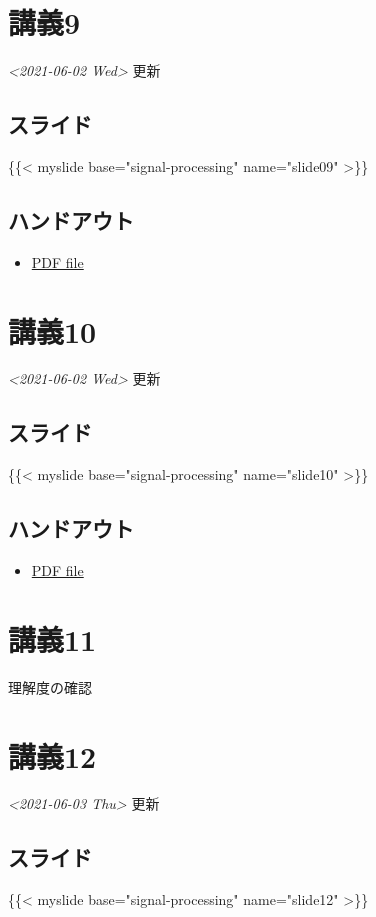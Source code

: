 \documentclass[11pt]{article}
\begin{document}
\section{講義9}
\label{sec:org04e2b0d}
\textit{<2021-06-02 Wed> } 更新
\subsection{スライド}
\label{sec:org9e6c635}
\{\{< myslide base="signal-processing" name="slide09" >\}\}
\subsection{ハンドアウト}
\label{sec:org899d6cc}
\begin{itemize}
\item \href{https://noboru-murata.github.io/signal-processing/pdfs/slide09.pdf}{PDF file}
\end{itemize}

\section{講義10}
\label{sec:orgad1e92f}
\textit{<2021-06-02 Wed> } 更新
\subsection{スライド}
\label{sec:orga77bdc4}
\{\{< myslide base="signal-processing" name="slide10" >\}\}
\subsection{ハンドアウト}
\label{sec:org4bb577f}
\begin{itemize}
\item \href{https://noboru-murata.github.io/signal-processing/pdfs/slide10.pdf}{PDF file}
\end{itemize}

\section{講義11}
\label{sec:org5a8589c}
理解度の確認
\section{講義12}
\label{sec:org7de66d5}
\textit{<2021-06-03 Thu> } 更新
\subsection{スライド}
\label{sec:orgcd1139d}
\{\{< myslide base="signal-processing" name="slide12" >\}\}
\end{document}
